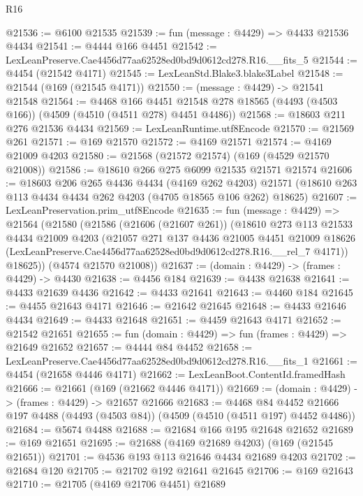 \begin{lexlean}{R16}
\begin{coremodule}
@21536 := @6100 @21535
@21539 := fun (message : @4429) => @4433 @21536 @4434
@21541 := @4444 @166 @4451
@21542 := LexLeanPreserve.Cae4456d77aa62528ed0bd9d0612cd278.R16.__fits_5
@21544 := @4454 (@21542 @4171)
@21545 := LexLeanStd.Blake3.blake3Label
@21548 := @21544 (@169 (@21545 @4171))
@21550 := (message : @4429) -> @21541 @21548
@21564 := @4468
    @166
    @4451
    @21548
    @278
    @18565
    (@4493 (@4503 @166))
    (@4509 (@4510 (@4511 @278) @4451 @4486))
@21568 := @18603 @211 @276 @21536 @4434
@21569 := LexLeanRuntime.utf8Encode
@21570 := @21569 @261
@21571 := @169 @21570
@21572 := @4169 @21571
@21574 := @4169 @21009 @4203
@21580 := @21568 (@21572 @21574) (@169 (@4529 @21570 @21008))
@21586 := @18610 @266 @275 @6099 @21535 @21571 @21574
@21606 := @18603
    @206
    @265
    @4436
    @4434
    (@4169 @262 @4203)
    @21571
    (@18610 @263 @113 @4434 @4434 @262 @4203 (@4705 @18565 @106 @262) @18625)
@21607 := LexLeanPreservation.prim_utf8Encode
@21635 := fun (message : @4429) =>
  @21564
    (@21580
      (@21586
        (@21606 (@21607 @261))
        (@18610
          @273
          @113
          @21533
          @4434
          @21009
          @4203
          (@21057
            @271
            @137
            @4436
            @21005
            @4451
            @21009
            @18626
            (LexLeanPreserve.Cae4456d77aa62528ed0bd9d0612cd278.R16.__rel_7 @4171))
          @18625))
      (@4574 @21570 @21008))
@21637 := (domain : @4429) -> (frames : @4429) -> @4430
@21638 := @4456 @184
@21639 := @4438 @21638
@21641 := @4433 @21639 @4436
@21642 := @4433 @21641
@21643 := @4460 @184
@21645 := @4455 @21643 @4171
@21646 := @21642 @21645
@21648 := @4433 @21646 @4434
@21649 := @4433 @21648
@21651 := @4459 @21643 @4171
@21652 := @21542 @21651
@21655 := fun (domain : @4429) => fun (frames : @4429) => @21649 @21652
@21657 := @4444 @84 @4452
@21658 := LexLeanPreserve.Cae4456d77aa62528ed0bd9d0612cd278.R16.__fits_1
@21661 := @4454 (@21658 @4446 @4171)
@21662 := LexLeanBoot.ContentId.framedHash
@21666 := @21661 (@169 (@21662 @4446 @4171))
@21669 := (domain : @4429) -> (frames : @4429) -> @21657 @21666
@21683 := @4468
    @84
    @4452
    @21666
    @197
    @4488
    (@4493 (@4503 @84))
    (@4509 (@4510 (@4511 @197) @4452 @4486))
@21684 := @5674 @4488
@21688 := @21684 @166 @195 @21648 @21652
@21689 := @169 @21651
@21695 := @21688 (@4169 @21689 @4203) (@169 (@21545 @21651))
@21701 := @4536 @193 @113 @21646 @4434 @21689 @4203
@21702 := @21684 @120
@21705 := @21702 @192 @21641 @21645
@21706 := @169 @21643
@21710 := @21705 (@4169 @21706 @4451) @21689

\end{coremodule}
\end{lexlean}
